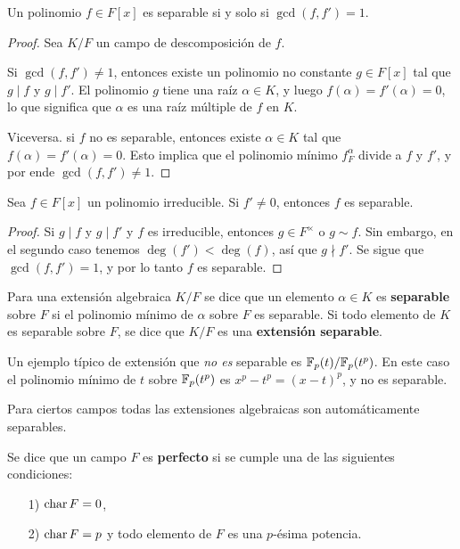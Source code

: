 \begin{corolario}
  Un polinomio $f\in F [x]$ es separable si y solo si $\gcd (f,f') = 1$.

  \begin{proof}
    Sea $K/F$ un campo de descomposición de $f$.
 
    Si $\gcd (f,f') \ne 1$, entonces existe un polinomio no constante
    $g \in F [x]$ tal que $g \mid f$ y $g \mid f'$. El polinomio $g$ tiene una
    raíz $\alpha \in K$, y luego $f (\alpha) = f' (\alpha) = 0$, lo que
    significa que $\alpha$ es una raíz múltiple de $f$ en $K$.

    Viceversa. si $f$ no es separable, entonces existe $\alpha \in K$ tal que
    $f (\alpha) = f' (\alpha) = 0$. Esto implica que el polinomio mínimo
    $f^\alpha_F$ divide a $f$ y $f'$, y por ende $\gcd (f,f') \ne 1$.
  \end{proof}
\end{corolario}

\begin{corolario}
  \label{cor:cuando-irreducible-es-separable}
  Sea $f \in F [x]$ un polinomio irreducible. Si $f' \ne 0$, entonces $f$ es
  separable.

  \begin{proof}
    Si $g \mid f$ y $g \mid f'$ y $f$ es irreducible, entonces $g \in F^\times$
    o $g \sim f$. Sin embargo, en el segundo caso tenemos $\deg (f') < \deg
    (f)$, así que $g \nmid f'$. Se sigue que $\gcd (f,f') = 1$, y por lo tanto
    $f$ es separable.
  \end{proof}
\end{corolario}

\begin{definicion}
  Para una extensión algebraica $K/F$ se dice que un elemento $\alpha \in K$ es
  \textbf{separable} sobre $F$ si el polinomio mínimo de $\alpha$ sobre $F$ es
  separable. Si todo elemento de $K$ es separable sobre $F$, se dice que $K/F$
  es una \textbf{extensión separable}.
\end{definicion}

Un ejemplo típico de extensión que \emph{no es} separable es
$\mathbb{F}_p (t)/\mathbb{F}_p (t^p)$. En este caso el polinomio mínimo de
$t$ sobre $\mathbb{F}_p (t^p)$ es $x^p - t^p = (x - t)^p$, y no es separable.

Para ciertos campos todas las extensiones algebraicas son automáticamente
separables.

\begin{definicion}
  Se dice que un campo $F$ es \textbf{perfecto} si se cumple una de las siguientes
  condiciones:
  \begin{enumerate}
  \item[1)] $\operatorname{char} F = 0$,
  \item[2)] $\operatorname{char} F = p$ y todo elemento de $F$ es una $p$-ésima potencia.
  \end{enumerate}
\end{definicion}

